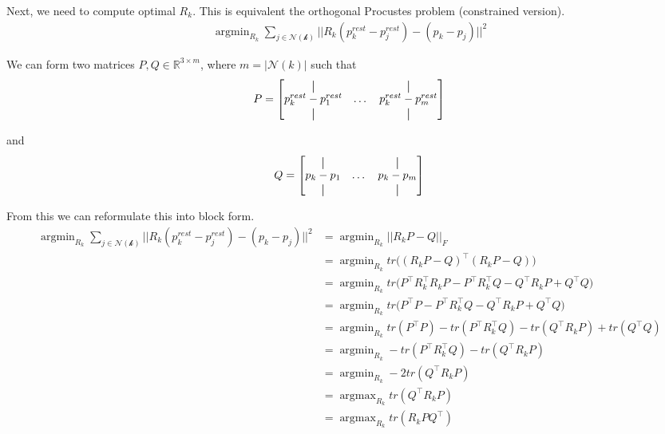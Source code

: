 \documentclass[a4paper]{article}
\DeclareMathOperator*{\argmax}{argmax}
\DeclareMathOperator*{\argmin}{argmin}
\newcommand*{\vertbar}{\rule[-1ex]{0.5pt}{2.5ex}}
\begin{document}
Next, we need to compute optimal $R_k$. This is equivalent the orthogonal Procustes problem (constrained version).
\begin{align*}
    \argmin_{R_k} \sum_{j \in \mathcal{N(k)}} ||R_k (p_k^{rest} - p_j^{rest}) - (p_k - p_j)||^2
\end{align*}

We can form two matrices $P, Q \in \mathbb{R}^{3 \times m}$, where $m = |\mathcal{N}(k)|$ such that
\[
    P = \begin{bmatrix}
        \vertbar & \  & \vertbar\\
        p_k^{rest} - p_1^{rest} & \dots & p_k^{rest} - p_m^{rest} \\
        \vertbar & \ & \vertbar\\
        \end{bmatrix}
\]

and
\[
    Q = \begin{bmatrix}
        \vertbar & \  & \vertbar\\
        p_k - p_1 & \dots & p_k - p_m \\
        \vertbar & \ & \vertbar\\
        \end{bmatrix}
\]

From this we can reformulate this into block form.
\begin{align*}
    \argmin_{R_k} \sum_{j \in \mathcal{N(k)}} ||R_k (p_k^{rest} - p_j^{rest}) - (p_k - p_j)||^2
    &= \argmin_{R_k} ||R_k P - Q||_{F} \\
    &= \argmin_{R_k} tr\Big((R_k P - Q)^\intercal (R_k P - Q)\Big) \\
    &= \argmin_{R_k} tr\Big(P^\intercal R_k^\intercal R_k P - P^\intercal R_k^\intercal Q - Q^\intercal R_k P + Q^\intercal Q \Big) \\
    &= \argmin_{R_k} tr\Big(P^\intercal P - P^\intercal R_k^\intercal Q - Q^\intercal R_k P + Q^\intercal Q \Big) \\
    &= \argmin_{R_k} tr(P^\intercal P) - tr(P^\intercal R_k^\intercal Q) - tr(Q^\intercal R_k P) + tr(Q^\intercal Q) \\
    &= \argmin_{R_k} - tr(P^\intercal R_k^\intercal Q) - tr(Q^\intercal R_k P) \\
    &= \argmin_{R_k} - 2tr(Q^\intercal R_k P) \\
    &= \argmax_{R_k} tr(Q^\intercal R_k P) \\
    &= \argmax_{R_k} tr(R_k P Q^\intercal)
\end{align*}
\end{document}
